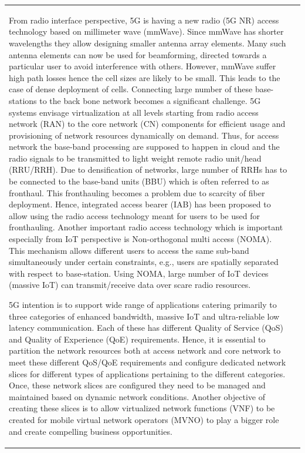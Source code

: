 {\begin{tabular}{p{.2\paperwidth}@{}!{\color{goldan-yellow}\vline width .9pt}p{.64\paperwidth}}
From radio interface perspective, 5G is having a new radio (5G NR) access technology based on millimeter wave (mmWave). Since mmWave has shorter wavelengths they allow designing smaller antenna array elements. Many such antenna elements can now be used for beamforming, directed towards a particular user to avoid interference with others. However, mmWave suffer high path losses hence the cell sizes are likely to be small. This leads to the case of dense deployment of cells. Connecting large number of these base-stations to the back bone network becomes a significant challenge. 5G systems envisage virtualization at all levels starting from radio access network (RAN) to the core network (CN) components for efficient usage and provisioning of network resources dynamically on demand. Thus, for access network the base-band processing are supposed to happen in cloud and the radio signals to be transmitted to light weight remote radio unit/head (RRU/RRH). Due to densification of networks, large number of RRHs has to be connected to the base-band units (BBU) which is often referred to as fronthaul. This fronthauling becomes a problem due to scarcity of fiber deployment. Hence, integrated access bearer (IAB) has been proposed to allow using the radio access technology meant for users to be used for fronthauling. Another important radio access technology which is important especially from IoT perspective is Non-orthogonal multi access (NOMA). This mechanism allows different users to access the same sub-band simultaneously under certain constraints, e.g., users are spatially separated with respect to base-station. Using NOMA, large number of IoT devices (massive IoT) can transmit/receive data over scare radio resources.

\bigskip

5G intention is to support wide range of applications catering primarily to three categories of enhanced bandwidth, massive IoT and ultra-reliable low latency communication. Each of these has different Quality of Service (QoS) and Quality of Experience (QoE) requirements. Hence, it is essential to partition the network resources both at access network and core network to meet these different QoS/QoE requirements and configure dedicated network slices for different types of applications pertaining to the different categories. Once, these network slices are configured they need to be managed and maintained based on dynamic network conditions. Another objective of creating these slices is to allow virtualized network functions (VNF) to be created for mobile virtual network operators (MVNO) to play a bigger role and create compelling business opportunities.


\end{tabular}}
